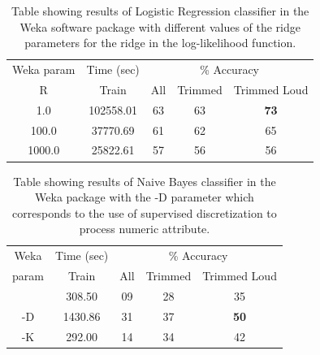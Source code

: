 \begin{table}
\begin{tabular}{|c|c|c|c|c|}
\hline
\multicolumn{1}{|c|}{Weka param} & \multicolumn{1}{c|}{Time (sec)} & \multicolumn{3}{c|}{\% Accuracy} \\
\hhline{|-|-|-|-|-|}
R & Train & All & Trimmed & Trimmed Loud \\
\hhline{|=|=|=|=|=|}
1.0      &    102558.01  &    63 & 63 & \textbf{73} \\
100.0    &     37770.69  &    61 & 62 & 65 \\
1000.0   &     25822.61  &    57 & 56 & 56 \\
\hline
\end{tabular}
\caption{Table showing results of Logistic
  Regression classifier in the Weka software package with different
  values of the ridge parameters for the ridge in the log-likelihood
  function.}
\label{table:calls-weka-logistic}
\end{table}


\begin{table}
\begin{tabular}{|c|c|c|c|c|}
\hline
\multicolumn{1}{|c|}{Weka} & \multicolumn{1}{c|}{Time (sec)} & \multicolumn{3}{c|}{\% Accuracy} \\
\hhline{|-|-|-|-|-|}
param & Train & All & Trimmed & Trimmed Loud \\
\hhline{|=|=|=|=|=|}
     &    308.50  &  09 & 28 & 35 \\
 -D  &   1430.86  &  31 & 37 & \textbf{50} \\
 -K  &    292.00  &  14 & 34 & 42 \\
\hline
\end{tabular}
\caption{Table showing results of Naive Bayes
  classifier in the Weka package with the -D parameter which
  corresponds to the use of supervised discretization to process
  numeric attribute.}
\label{table:calls-weka-naiveBayes}
\end{table}


